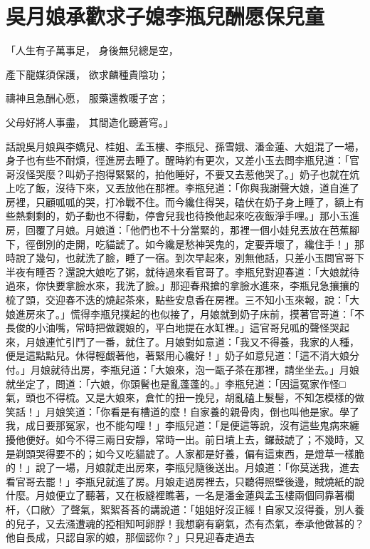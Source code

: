 %

\chapter{吳月娘承歡求子媳\KG 李瓶兒酬愿保兒童}

「人生有子萬事足，  身後無兒總是空，

產下龍媒須保護，  欲求麟種貴陰功；

禱神且急酬心愿，  服藥還教暖子宮；

父母好將人事盡，  其間造化聽蒼穹。」

話說吳月娘與李嬌兒、桂姐、孟玉樓、李瓶兒、孫雪娥、潘金蓮、大姐混了一場，身子也有些不耐煩，徑進房去睡了。醒時約有更次，又差小玉去問李瓶兒道：「官哥沒怪哭麼？叫奶子抱得緊緊的，拍他睡好，不要又去惹他哭了。」奶子也就在炕上吃了飯，沒待下來，又丟放他在那裡。李瓶兒道：「你與我謝聲大娘，道自進了房裡，只顧呱呱的哭，打冷戰不住。而今纔住得哭，磕伏在奶子身上睡了，額上有些熱剩剩的，奶子動也不得動，停會兒我也待換他起來吃夜飯淨手哩。」那小玉進房，回覆了月娘。月娘道：「他們也不十分當緊的，那裡一個小娃兒丟放在芭蕉腳下，徑倒別的走開，吃貓諕了。如今纔是愁神哭鬼的，定要弄壞了，纔住手！」那時說了幾句，也就洗了臉，睡了一宿。到次早起來，別無他話，只差小玉問官哥下半夜有睡否？還說大娘吃了粥，就待過來看官哥了。李瓶兒對迎春道：「大娘就待過來，你快要拿臉水來，我洗了臉。」那迎春飛搶的拿臉水進來，李瓶兒急攘攘的梳了頭，交迎春不迭的燒起茶來，點些安息香在房裡。三不知小玉來報，說：「大娘進房來了。」慌得李瓶兒撲起的也似接了，月娘就到奶子床前，摸著官哥道：「不長俊的小油嘴，常時把做親娘的，平白地提在水缸裡。」這官哥兒呱的聲怪哭起來，月娘連忙引鬥了一番，就住了。月娘對如意道：「我又不得養，我家的人種，便是這點點兒。休得輕覷著他，著緊用心纔好！」奶子如意兒道：「這不消大娘分付。」月娘就待出房，李瓶兒道：「大娘來，泡一甌子茶在那裡，請坐坐去。」月娘就坐定了，問道：「六娘，你頭鬢也是亂蓬蓬的。」李瓶兒道：「因這冤家作怪□氣，頭也不得梳。又是大娘來，倉忙的扭一挽兒，胡亂磕上髮髻，不知怎模樣的做笑話！」月娘笑道：「你看是有槽道的麼！自家養的親骨肉，倒也叫他是家。學了我，成日要那冤家，也不能勾哩！」李瓶兒道：「是便這等說，沒有這些鬼病來纏擾他便好。如今不得三兩日安靜，常時一出。前日墳上去，鑼鼓諕了；不幾時，又是剃頭哭得要不的；如今又吃貓諕了。人家都是好養，偏有這東西，是燈草一樣脆的！」說了一場，月娘就走出房來，李瓶兒隨後送出。月娘道：「你莫送我，進去看官哥去罷！」李瓶兒就進了房。月娘走過房裡去，只聽得照壁後邊，賊燒紙的說什麼。月娘便立了聽著，又在板縫裡瞧著，一名是潘金蓮與孟玉樓兩個同靠著欄杆，〈口敝〉了聲氣，絮絮荅荅的講說道：「姐姐好沒正經！自家又沒得養，別人養的兒子，又去漒遭魂的掗相知呵卵脬！我想窮有窮氣，杰有杰氣，奉承他做甚的？他自長成，只認自家的娘，那個認你？」只見迎春走過去